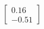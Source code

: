 \documentclass[preview]{standalone}
\begin{document}
\begin{align*}
\begin{bmatrix} 0.16 \\ -0.51 \end{bmatrix}
\end{align*}
\end{document}
